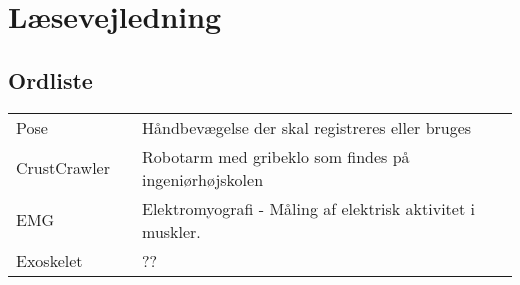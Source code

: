 \section{Læsevejledning}
\subsection*{Ordliste}
\begin{tabular}{lll}
	Pose && Håndbevægelse der skal registreres eller bruges\\
	CrustCrawler && Robotarm med gribeklo som findes på ingeniørhøjskolen\\
	EMG && Elektromyografi - Måling af elektrisk aktivitet i muskler.\\
	Exoskelet && ??
\end{tabular}
